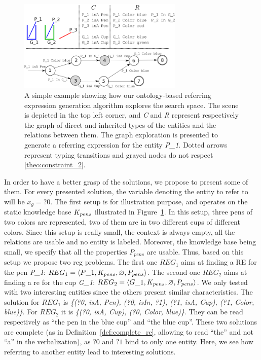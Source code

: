 \documentclass[a4paper,11pt,twoside]{StyleThese}
\begin{document}
\begin{figure}[hbtp]
\centering
\includegraphics[width=0.7\textwidth]{figures/chapter3/search.png}
\caption{A simple example showing how our ontology-based referring expression generation algorithm explores the search space. The scene is depicted in the top left corner, and \textit{C} and \textit{R} represent respectively the graph of direct and inherited types of the entities and the relations between them. The graph exploration is presented to generate a referring expression for the entity \textit{P\_1}. Dotted arrows represent typing transitions and grayed nodes do not respect \ref{theo:constraint_2}.}
\label{fig:search_example} 
\end{figure}

In order to have a better grasp of the solutions, we propose to present some of them. For every presented solution, the variable denoting the entity to refer to will be $x_g = ?0$.
The first setup is for illustration purpose, and operates on the static knowledge base $K_{pens}$ illustrated in Figure~\ref{fig:search_example}. In this setup, three pens of two colors are represented, two of them are in two different cups of different colors.
Since this setup is really small, the context is always empty, all the relations are usable and no entity is labeled. Moreover, the knowledge base being small, we specify that all the properties $P_{pens}$ are usable.
Thus, based on this setup we propose two \acrshort{reg} problems. The first one $REG_1$ aims at finding a RE for the pen \textit{P\_1}: $REG_1 = \langle P\_1, K_{pens}, \varnothing, P_{pens} \rangle$. The second one $REG_2$ aims at finding a \acrshort{re} for the cup \textit{G\_1}: $REG_2 = \langle G\_1, K_{pens}, \varnothing, P_{pens} \rangle$.
We only tested with two interesting entities since the others present similar characteristics.
The solution for $REG_1$ is \textit{\{(?0, isA, Pen), (?0, isIn, ?1), (?1, isA, Cup), (?1, Color, blue)\}}. For $REG_2$ it is \textit{\{(?0, isA, Cup), (?0, Color, blue)\}}. They can be read respectively as ``the pen in the blue cup'' and ``the blue cup''. These two solutions are complete (as in Definition~\ref{def:complete_re}, allowing to read ``the'' and not ``a'' in the verbalization), as $?0$ and $?1$ bind to only one entity. Here, we see how referring to another entity lead to interesting solutions.
\end{document}
